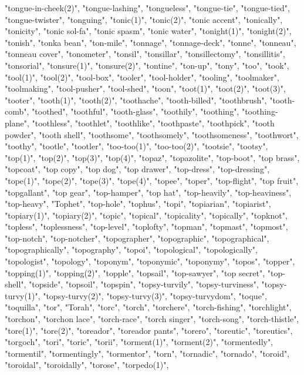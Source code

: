 "tongue-in-cheek(2)",
"tongue-lashing",
"tongueless",
"tongue-tie",
"tongue-tied",
"tongue-twister",
"tonguing",
"tonic(1)",
"tonic(2)",
"tonic accent",
"tonically",
"tonicity",
"tonic sol-fa",
"tonic spasm",
"tonic water",
"tonight(1)",
"tonight(2)",
"tonish",
"tonka bean",
"ton-mile",
"tonnage",
"tonnage-deck",
"tonne",
"tonneau",
"tonneau cover",
"tonometer",
"tonsil",
"tonsillar",
"tonsillectomy",
"tonsillitis",
"tonsorial",
"tonsure(1)",
"tonsure(2)",
"tontine",
"ton-up",
"tony",
"too",
"took",
"tool(1)",
"tool(2)",
"tool-box",
"tooler",
"tool-holder",
"tooling",
"toolmaker",
"toolmaking",
"tool-pusher",
"tool-shed",
"toon",
"toot(1)",
"toot(2)",
"toot(3)",
"tooter",
"tooth(1)",
"tooth(2)",
"toothache",
"tooth-billed",
"toothbrush",
"tooth-comb",
"toothed",
"toothful",
"tooth-glass",
"toothily",
"toothing",
"toothing-plane",
"toothless",
"toothlet",
"toothlike",
"toothpaste",
"toothpick",
"tooth powder",
"tooth shell",
"toothsome",
"toothsomely",
"toothsomeness",
"toothwort",
"toothy",
"tootle",
"tootler",
"too-too(1)",
"too-too(2)",
"tootsie",
"tootsy",
"top(1)",
"top(2)",
"top(3)",
"top(4)",
"topaz",
"topazolite",
"top-boot",
"top brass",
"topcoat",
"top copy",
"top dog",
"top drawer",
"top-dress",
"top-dressing",
"tope(1)",
"tope(2)",
"tope(3)",
"tope(4)",
"topee",
"toper",
"top-flight",
"top fruit",
"topgallant",
"top gear",
"top-hamper",
"top hat",
"top-heavily",
"top-heaviness",
"top-heavy",
"Tophet",
"top-hole",
"tophus",
"topi",
"topiarian",
"topiarist",
"topiary(1)",
"topiary(2)",
"topic",
"topical",
"topicality",
"topically",
"topknot",
"topless",
"toplessness",
"top-level",
"toplofty",
"topman",
"topmast",
"topmost",
"top-notch",
"top-notcher",
"topographer",
"topographic",
"topographical",
"topographically",
"topography",
"topoi",
"topological",
"topologically",
"topologist",
"topology",
"toponym",
"toponymic",
"toponymy",
"topos",
"topper",
"topping(1)",
"topping(2)",
"topple",
"topsail",
"top-sawyer",
"top secret",
"top-shell",
"topside",
"topsoil",
"topspin",
"topsy-turvily",
"topsy-turviness",
"topsy-turvy(1)",
"topsy-turvy(2)",
"topsy-turvy(3)",
"topsy-turvydom",
"toque",
"toquilla",
"tor",
"Torah",
"torc",
"torch",
"torchere",
"torch-fishing",
"torchlight",
"torchon",
"torchon lace",
"torch-race",
"torch singer",
"torch-song",
"torch-thistle",
"tore(1)",
"tore(2)",
"toreador",
"toreador pants",
"torero",
"toreutic",
"toreutics",
"torgoch",
"tori",
"toric",
"torii",
"torment(1)",
"torment(2)",
"tormentedly",
"tormentil",
"tormentingly",
"tormentor",
"torn",
"tornadic",
"tornado",
"toroid",
"toroidal",
"toroidally",
"torose",
"torpedo(1)",
